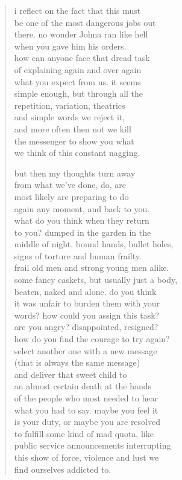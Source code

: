 \begin{verse}
i reflect on the fact that this must \\
be one of the most dangerous jobs out \\
there. no wonder Johna ran like hell \\
when you gave him his orders. \\
how can anyone face that dread task \\
of explaining again and over again  \\
what you expect from us. it seems \\
simple enough, but through all the \\
repetition, variation, theatrics \\
and simple words we reject it, \\
and more often then not we kill  \\
the messenger to show you what \\
we think of this constant nagging.

but then my thoughts turn away \\
from what we've done, do, are \\
most likely are preparing to do \\
again any moment, and back to you. \\
what do you think when they return \\
to you? dumped in the garden in the \\
middle of night. bound hands, bullet holes, \\
signs of torture and human frailty. \\
frail old men and strong young men alike. \\
some fancy caskets, but usually just a body, \\
beaten, naked and alone. do you think \\
it was unfair to burden them with your \\
words? how could you assign this task? \\
are you angry? disappointed, resigned? \\
how do you find the courage to try again? \\
select another one with a new message \\
(that is always the same message) \\
and deliver that sweet child to  \\
an almost certain death at the hands \\
of the people who most needed to hear \\
what you had to say. maybe you feel it \\
is your duty, or maybe you are resolved \\
to fulfill some kind of mad quota, like \\
public service announcements interrupting \\
this show of force, violence and lust we \\
find ourselves addicted to.


\end{verse}
